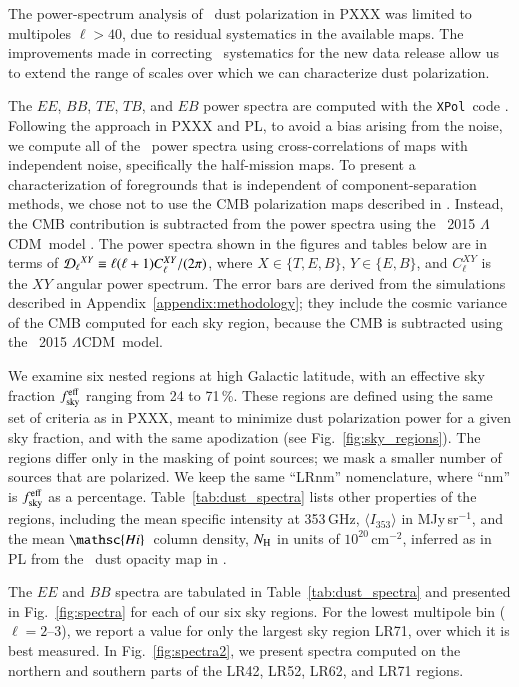 \documentclass[longauth,traditabstract]{aa}
\def\LCDM{$\Lambda$CDM}
\newcommand{\hi}{\ensuremath{\mathsc {Hi}}}
\newcommand{\XPol}{\texttt{XPol}}
\newcommand{\DS}[1]{{\bf \color{ForestGreen} [DS: #1]}}
\newcommand{\ainten}{\langle I_{353}\rangle} %
\begin{document}
The power-spectrum analysis of \Planck\ dust polarization in PXXX was limited to multipoles $\ell > 40$, 
due to residual systematics in the available maps. 
The improvements made in correcting \Planck\ systematics for the new data release
allow us to extend the range of scales over which we can characterize dust polarization. 
 
The $EE$, $BB$, $TE$, $TB$, and $EB$ power spectra are computed with the \XPol\ code \citep{Tristram05}.  Following the approach in PXXX and PL, to avoid a bias arising from the noise, we compute all of the \Planck\ power spectra using cross-correlations of maps
with independent noise, specifically the half-mission maps.
%
To present a characterization of foregrounds that is independent of component-separation methods, 
we chose not to use the CMB polarization maps described in \citet{planck2016-l04}.
Instead, the CMB contribution is subtracted from the power spectra using 
the \Planck\ 2015 \LCDM\ model \citep{planck2014-a15}. 
The power spectra shown in the figures and tables below 
are in terms of ${\cal D_\ell}^{XY}\equiv\ell(\ell+1)C_\ell^{XY}/(2\pi)$, where $X \in \{T,E,B\}$, $Y \in \{E,B\}$, and $C_\ell^{XY}$ is the $XY$ angular power spectrum. 
The error bars are derived from the simulations described in Appendix~\ref{appendix:methodology};
they include the cosmic variance of the CMB computed for each sky region, because the CMB is subtracted using the \Planck\ 2015 \LCDM\ model. %
%

We examine six nested regions at high Galactic latitude, with an effective sky fraction $f_{\rm sky}^{\rm eff}$ ranging from 24 to 71\,\%.
%
These regions are defined using the same set of criteria as in PXXX,
meant to minimize dust polarization power for a given sky fraction,
and with the same apodization (see Fig.~\ref{fig:sky_regions}). 
The regions differ only in the masking of point sources; we mask a smaller number of sources that are polarized. 
We keep the same ``LRnm'' nomenclature, where ``nm'' is $f_{\rm sky}^{\rm eff}$ as a percentage. 
%
Table~\ref{tab:dust_spectra} lists other properties of the regions, including
the mean specific intensity at 353\,GHz, $\ainten$ in MJy\,sr$^{-1}$, and the mean \hi\ column density, $N_{\rm H}$ in units of $10^{20}$\,cm$^{-2}$,
inferred as in PL from the \Planck\ dust opacity map
in \citet{planck2016-XLVIII}.

The $EE$ and $BB$ spectra are tabulated in Table~\ref{tab:dust_spectra} and presented in Fig.~\ref{fig:spectra} for each of our six sky regions.
For the lowest multipole bin ($\ell=2$--3), we report a value for only the largest sky region LR71, over which it is best measured. 
In Fig.~\ref{fig:spectra2}, we present spectra computed on the northern and southern parts of the LR42, LR52, LR62, and LR71 regions. 
\end{document}

